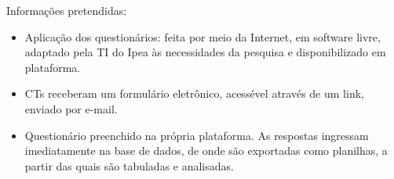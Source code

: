 

\begin{block}{Informações pretendidas:}
	
\begin{itemize}
	\item Aplicação dos questionários: feita por meio da Internet, em software livre, adaptado pela TI do Ipea às necessidades da pesquisa e disponibilizado em plataforma.
	\item CTs receberam um formulário eletrônico, acessével através de um link, enviado por e-mail.
	\item Questionário preenchido na própria plataforma. As respostas ingressam imediatamente na base de dados, de onde são exportadas como planilhas, a partir das quais são tabuladas e analisadas.
\end{itemize}

\end{block}
